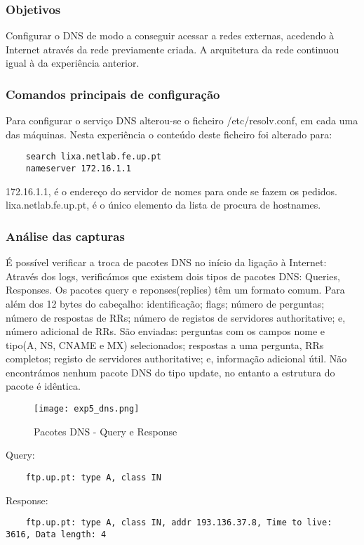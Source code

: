 \documentclass[a4paper]{article}
\begin{document}
\subsubsection{Objetivos}
Configurar o DNS de modo a conseguir acessar a redes externas, acedendo à
Internet através da rede previamente criada. A arquitetura da rede continuou
igual à da experiência anterior.

\subsubsection{Comandos principais de configuração}
Para configurar o serviço DNS alterou-se o ficheiro /etc/resolv.conf, em cada
uma das máquinas. Nesta experiência o conteúdo deste ficheiro foi alterado
para:

\begin{verbatim}
	search lixa.netlab.fe.up.pt
	nameserver 172.16.1.1
\end{verbatim}

172.16.1.1, é o endereço do servidor de nomes para onde se fazem os pedidos.
lixa.netlab.fe.up.pt, é o único elemento da lista de procura de hostnames.


\subsubsection{Análise das capturas}

É possível verificar a troca de pacotes DNS no início da ligação à Internet:
Através dos logs, verificámos que existem dois tipos de pacotes DNS: Queries,
Responses. Os pacotes query e reponses(replies) têm um formato comum. Para além
dos 12 bytes do cabeçalho: identificação; flags; número de perguntas; número de
respostas de RRs; número de registos de servidores authoritative; e, número
adicional de RRs. São enviadas: perguntas com os campos nome e tipo(A, NS,
CNAME e MX) selecionados; respostas a uma pergunta, RRs completos; registo de
servidores authoritative; e, informação adicional útil. Não encontrámos nenhum
pacote DNS do tipo update, no entanto a estrutura do pacote é idêntica.

\begin{figure}[h]
    \centering
    \texttt{[image: exp5\_dns.png]}
    \caption{Pacotes DNS - Query e Response}
\end{figure}

Query:
\begin{verbatim}
	ftp.up.pt: type A, class IN
\end{verbatim}
Response:
\begin{verbatim}
	ftp.up.pt: type A, class IN, addr 193.136.37.8, Time to live: 3616, Data length: 4
\end{verbatim}
\end{document}
